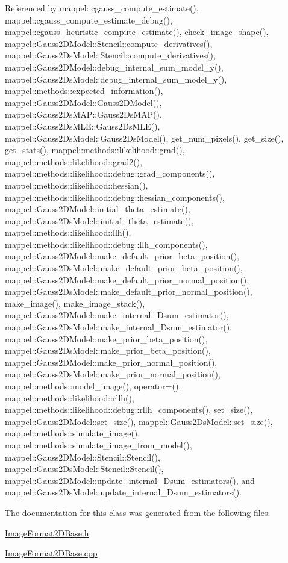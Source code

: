 Referenced by mappel\+::cgauss\+\_\+compute\+\_\+estimate(), mappel\+::cgauss\+\_\+compute\+\_\+estimate\+\_\+debug(), mappel\+::cgauss\+\_\+heuristic\+\_\+compute\+\_\+estimate(), check\+\_\+image\+\_\+shape(), mappel\+::\+Gauss2\+D\+Model\+::\+Stencil\+::compute\+\_\+derivatives(), mappel\+::\+Gauss2\+Ds\+Model\+::\+Stencil\+::compute\+\_\+derivatives(), mappel\+::\+Gauss2\+D\+Model\+::debug\+\_\+internal\+\_\+sum\+\_\+model\+\_\+y(), mappel\+::\+Gauss2\+Ds\+Model\+::debug\+\_\+internal\+\_\+sum\+\_\+model\+\_\+y(), mappel\+::methods\+::expected\+\_\+information(), mappel\+::\+Gauss2\+D\+Model\+::\+Gauss2\+D\+Model(), mappel\+::\+Gauss2\+Ds\+M\+A\+P\+::\+Gauss2\+Ds\+M\+A\+P(), mappel\+::\+Gauss2\+Ds\+M\+L\+E\+::\+Gauss2\+Ds\+M\+L\+E(), mappel\+::\+Gauss2\+Ds\+Model\+::\+Gauss2\+Ds\+Model(), get\+\_\+num\+\_\+pixels(), get\+\_\+size(), get\+\_\+stats(), mappel\+::methods\+::likelihood\+::grad(), mappel\+::methods\+::likelihood\+::grad2(), mappel\+::methods\+::likelihood\+::debug\+::grad\+\_\+components(), mappel\+::methods\+::likelihood\+::hessian(), mappel\+::methods\+::likelihood\+::debug\+::hessian\+\_\+components(), mappel\+::\+Gauss2\+D\+Model\+::initial\+\_\+theta\+\_\+estimate(), mappel\+::\+Gauss2\+Ds\+Model\+::initial\+\_\+theta\+\_\+estimate(), mappel\+::methods\+::likelihood\+::llh(), mappel\+::methods\+::likelihood\+::debug\+::llh\+\_\+components(), mappel\+::\+Gauss2\+D\+Model\+::make\+\_\+default\+\_\+prior\+\_\+beta\+\_\+position(), mappel\+::\+Gauss2\+Ds\+Model\+::make\+\_\+default\+\_\+prior\+\_\+beta\+\_\+position(), mappel\+::\+Gauss2\+D\+Model\+::make\+\_\+default\+\_\+prior\+\_\+normal\+\_\+position(), mappel\+::\+Gauss2\+Ds\+Model\+::make\+\_\+default\+\_\+prior\+\_\+normal\+\_\+position(), make\+\_\+image(), make\+\_\+image\+\_\+stack(), mappel\+::\+Gauss2\+D\+Model\+::make\+\_\+internal\+\_\+Dsum\+\_\+estimator(), mappel\+::\+Gauss2\+Ds\+Model\+::make\+\_\+internal\+\_\+Dsum\+\_\+estimator(), mappel\+::\+Gauss2\+D\+Model\+::make\+\_\+prior\+\_\+beta\+\_\+position(), mappel\+::\+Gauss2\+Ds\+Model\+::make\+\_\+prior\+\_\+beta\+\_\+position(), mappel\+::\+Gauss2\+D\+Model\+::make\+\_\+prior\+\_\+normal\+\_\+position(), mappel\+::\+Gauss2\+Ds\+Model\+::make\+\_\+prior\+\_\+normal\+\_\+position(), mappel\+::methods\+::model\+\_\+image(), operator=(), mappel\+::methods\+::likelihood\+::rllh(), mappel\+::methods\+::likelihood\+::debug\+::rllh\+\_\+components(), set\+\_\+size(), mappel\+::\+Gauss2\+D\+Model\+::set\+\_\+size(), mappel\+::\+Gauss2\+Ds\+Model\+::set\+\_\+size(), mappel\+::methods\+::simulate\+\_\+image(), mappel\+::methods\+::simulate\+\_\+image\+\_\+from\+\_\+model(), mappel\+::\+Gauss2\+D\+Model\+::\+Stencil\+::\+Stencil(), mappel\+::\+Gauss2\+Ds\+Model\+::\+Stencil\+::\+Stencil(), mappel\+::\+Gauss2\+D\+Model\+::update\+\_\+internal\+\_\+Dsum\+\_\+estimators(), and mappel\+::\+Gauss2\+Ds\+Model\+::update\+\_\+internal\+\_\+Dsum\+\_\+estimators().



The documentation for this class was generated from the following files\+:\begin{DoxyCompactItemize}
\item 
\hyperlink{ImageFormat2DBase_8h}{Image\+Format2\+D\+Base.\+h}\item 
\hyperlink{ImageFormat2DBase_8cpp}{Image\+Format2\+D\+Base.\+cpp}\end{DoxyCompactItemize}
